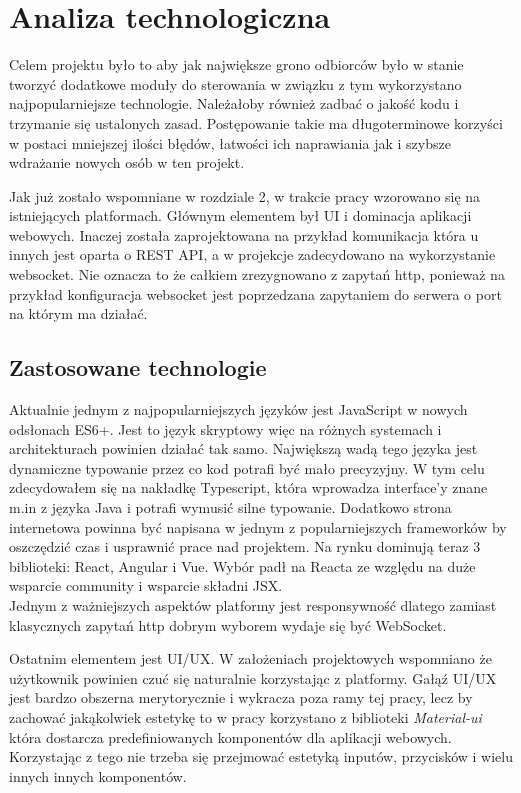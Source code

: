 \chapter{Analiza technologiczna}
Celem projektu było to aby jak największe grono odbiorców było w stanie tworzyć dodatkowe moduły do sterowania w związku z tym wykorzystano najpopularniejsze technologie. Należałoby również zadbać o jakość kodu i trzymanie się ustalonych zasad. Postępowanie takie ma długoterminowe korzyści w postaci mniejszej ilości błędów, łatwości ich naprawiania jak i szybsze wdrażanie nowych osób w ten projekt. 
\par Jak już zostało wspomniane w rozdziale 2, w trakcie pracy wzorowano się na istniejących platformach. Głównym elementem był UI i dominacja aplikacji webowych. Inaczej została zaprojektowana na przykład komunikacja która u innych jest oparta o REST API, a w projekcje zadecydowano na wykorzystanie websocket. Nie oznacza to że całkiem zrezygnowano z zapytań http, ponieważ na przykład konfiguracja websocket jest poprzedzana zapytaniem do serwera o port na którym ma działać.
\section{Zastosowane technologie}
Aktualnie jednym z najpopularniejszych języków jest JavaScript w nowych odsłonach ES6+. Jest to język skryptowy więc na różnych systemach i architekturach powinien działać tak samo. Największą wadą tego języka jest dynamiczne typowanie przez co kod potrafi być mało precyzyjny. W tym celu zdecydowałem się na nakładkę Typescript, która wprowadza interface'y znane m.in z języka Java i potrafi wymusić silne typowanie. Dodatkowo strona internetowa powinna być napisana w jednym z popularniejszych frameworków by oszczędzić czas i usprawnić prace nad projektem. Na rynku dominują teraz 3 biblioteki: React, Angular i Vue. Wybór padł na Reacta ze względu na duże wsparcie community i wsparcie składni JSX. \\
Jednym z ważniejszych aspektów platformy jest responsywność dlatego zamiast klasycznych zapytań http dobrym wyborem wydaje się być WebSocket. 
\par Ostatnim elementem jest UI/UX. W założeniach projektowych wspomniano że użytkownik powinien czuć się naturalnie korzystając z platformy. Gałąź UI/UX jest bardzo obszerna merytorycznie i wykracza poza ramy tej pracy, lecz by zachować jakąkolwiek estetykę to w pracy korzystano z biblioteki \textit{Material-ui} która dostarcza predefiniowanych komponentów dla aplikacji webowych. Korzystając z tego nie trzeba się przejmować estetyką inputów, przycisków i wielu innych innych komponentów. 
